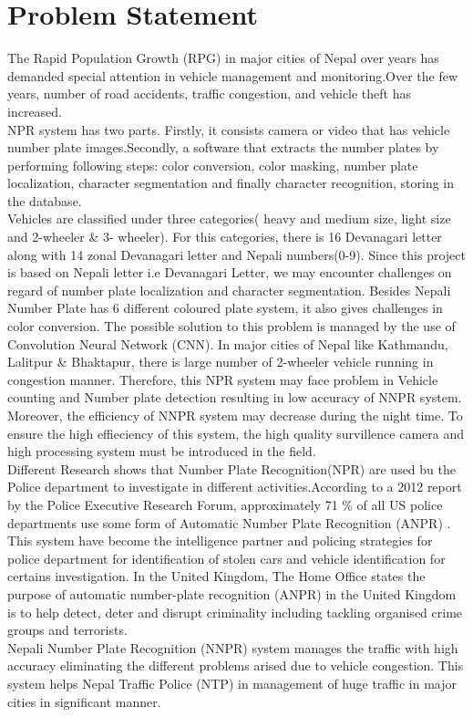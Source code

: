 \section{Problem Statement}
The Rapid Population Growth (RPG) in major cities of Nepal over years has demanded special attention in vehicle management and monitoring.Over the few years, number of road accidents, traffic congestion, and vehicle theft has increased. \\
NPR system has two parts. Firstly, it consists camera or video that has vehicle number plate images.Secondly, a software that extracts the number plates by performing following steps: color conversion, color masking, number plate localization, character segmentation and finally character recognition, storing in  the database.\\
Vehicles are classified under three categories( heavy and medium size, light size and 2-wheeler \& 3- wheeler). For this categories, there is 16 Devanagari letter along with 14 zonal Devanagari letter and Nepali numbers(0-9). Since this project is based on Nepali letter i.e Devanagari Letter, we may encounter challenges on regard of number plate localization and character segmentation. Besides Nepali Number Plate has 6 different coloured plate system, it also gives challenges in color conversion. The possible solution to this problem is managed by the use of Convolution Neural Network (CNN). In major cities of Nepal like Kathmandu, Lalitpur \& Bhaktapur, there is large number of 2-wheeler vehicle running in congestion manner. Therefore, this NPR system may face problem in Vehicle counting and Number plate detection resulting in low accuracy of NNPR system. Moreover, the efficiency of NNPR system may decrease during the night time. To ensure the high effieciency of this system, the high quality survillence camera and high processing system must be introduced in the field. 
\\
Different Research shows that Number Plate Recognition(NPR) are used bu the Police department to investigate in different activities.According to a 2012 report by the Police Executive Research Forum, approximately 71 \% of all US police departments use some form of Automatic Number Plate Recognition (ANPR) \cite{anpr_wikipedia}. This system have become the intelligence partner and policing strategies for police department for identification of stolen cars and vehicle identification for certains investigation. In  the United Kingdom, The Home Office states the purpose of automatic number-plate recognition (ANPR) in the United Kingdom is to help detect, deter and disrupt criminality including tackling organised crime groups and terrorists\cite{anpr_wikipedia}.
\\
Nepali Number Plate Recognition (NNPR) system manages the traffic with high accuracy eliminating the different problems arised due to vehicle congestion. This system helps Nepal Traffic Police (NTP) in management of huge traffic in major cities in significant manner.

